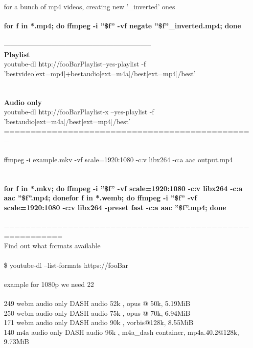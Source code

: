 \documentclass[10pt,a4paper]{article}
\begin{document}
{{{{{{{{{{{{{{\\
for a bunch of mp4 videos, creating new '\_inverted' ones\\
\\
\textbf{for f in *.mp4; do ffmpeg -i ''\$f'' -vf negate ''\$f''\_inverted.mp4; done}}{\Large \\
\\
-----------------------------------------------------------------\\
\textbf{Playlist}}{\large \\
youtube-dl http://fooBarPlaylist}{\large  --yes-playlist -f 'bestvideo[ext=mp4]+bestaudio[ext=m4a]/best[ext=mp4]/best'\\
\\
\textbf{\\
Audio only}}{\large \\
youtube-dl http://fooBarPlaylist}{\large  -x --yes-playlist -f 'bestaudio[ext=m4a]/best[ext=mp4]/best'}{\large \\
===============================================\\
\\
ffmpeg -i example.mkv -vf scale=1920:1080 -c:v libx264 -c:a aac output.mp4\\
\\
\\
}\textbf{{\Large for f in *.mkv; do ffmpeg -i ''\$f'' -vf scale=1920:1080 -c:v libx264 -c:a aac ''\$f''.mp4; done}}{\large }\textbf{{\Large for f in *.wemb; do ffmpeg -i ''\$f'' -vf scale=1920:1080 -c:v libx264 -preset fast -c:a aac ''\$f''.mp4; done}}{\large \\
\\
=========================================================\\
Find out what formats available\\
\\
\$ youtube-dl --list-formats https://fooBar}{\large \\
\\
example for 1080p we need 22\\
\\
249          webm       audio only DASH audio   52k , opus @ 50k, 5.19MiB\\
250          webm       audio only DASH audio   75k , opus @ 70k, 6.94MiB\\
171          webm       audio only DASH audio   90k , vorbis@128k, 8.55MiB\\
140          m4a        audio only DASH audio   96k , m4a\_dash container, mp4a.40.2@128k, 9.73MiB\\
}}}}}}}}}}}}}}
\end{document}
